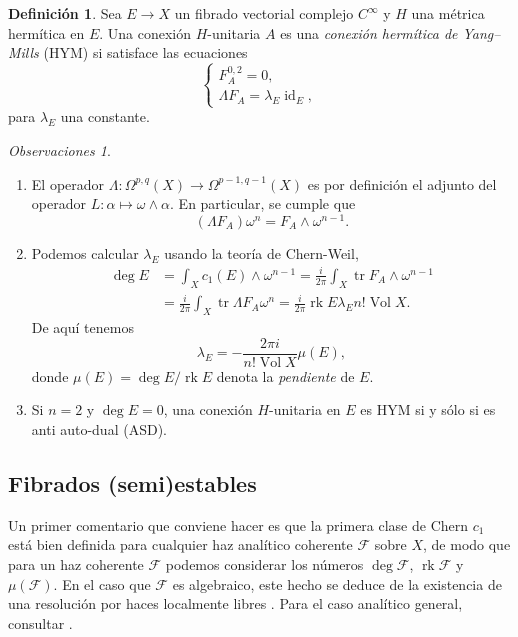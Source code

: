 \documentclass[12pt, a4paper]{amsart}
\newcommand\FF{\mathscr{F}}
\DeclareMathOperator\id{id}
\DeclareMathOperator\tr{tr}
\DeclareMathOperator\rk{rk}
\DeclareMathOperator\Vol{Vol}
\theoremstyle{remark} \newtheorem{rmk}[thm]{Observación}
\theoremstyle{remark} \newtheorem{rmks}[thm]{Observaciones}
\theoremstyle{definition} \newtheorem{defn}[thm]{Definición}
\theoremstyle{definition} \newtheorem{ejs}[thm]{Ejemplos}
\theoremstyle{definition} \newtheorem{ej}[thm]{Ejemplo}
\begin{document}
	\begin{defn}
		Sea $E\rightarrow X$ un fibrado vectorial complejo $C^\infty$ y $H$ una métrica hermítica en $E$. Una conexión $H$-unitaria $A$ es una \emph{conexión hermítica de Yang--Mills} (HYM) si satisface las ecuaciones
		\begin{equation*}
		\begin{cases}
			F_A^{0,2}=0, \\
			\Lambda F_A = \lambda_E \id_E,
		\end{cases}
		\end{equation*} 
		para $\lambda_E$ una constante.
	\end{defn}	
	\begin{rmks}
		\begin{enumerate} 
			\item El operador $\Lambda:\Omega^{p,q}(X)\rightarrow \Omega^{p-1,q-1}(X)$ es por definición el adjunto del operador $L: \alpha \mapsto \omega \wedge \alpha$. En particular, se cumple que
				\begin{equation*}
					(\Lambda F_A)\omega^n = F_A \wedge \omega^{n-1}.
				\end{equation*} 

			\item Podemos calcular $\lambda_E$ usando la teoría de Chern-Weil,
				 \begin{align*}
					 \deg E &= \int_X c_1(E)\wedge \omega^{n-1} = \frac{i}{2\pi} \int_X \tr F_A \wedge \omega^{n-1} \\ &= \frac{i}{2\pi} \int_X \tr \Lambda F_A \omega^n = \frac{i}{2\pi} \rk E \lambda_E n! \Vol X.
				\end{align*} 
		De aquí tenemos
		\begin{equation*}
			\lambda_E = - \frac{2\pi i}{n! \Vol X}\mu(E),
		\end{equation*} 
		donde $\mu(E)=\deg E/\rk E$ denota la \emph{pendiente} de $E$.

	\item Si $n=2$ y $\deg E = 0$, una conexión $H$-unitaria en $E$ es HYM si y sólo si es anti auto-dual (ASD).
		\end{enumerate}
	\end{rmks}

	\subsection{Fibrados (semi)estables}
	Un primer comentario que conviene hacer es que la primera clase de Chern $c_1$ está bien definida para cualquier haz analítico coherente $\FF$ sobre $X$, de modo que para un haz coherente $\FF$ podemos considerar los números $\deg \FF$, $\rk \FF$ y $\mu(\FF)$. En el caso que $\FF$ es algebraico, este hecho se deduce de la existencia de una resolución por haces localmente libres \cite{GRR}. Para el caso analítico general, consultar \cite{Kobayashi}. 
\end{document}
